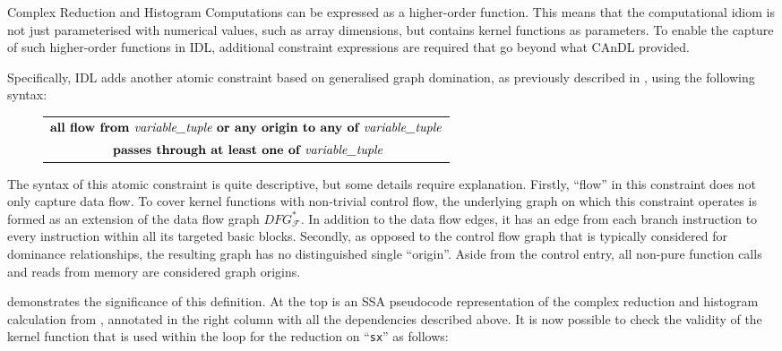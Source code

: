     Complex Reduction and Histogram Computations can be expressed as a
    higher-order function.
    This means that the computational idiom is not just parameterised with
    numerical values, such as array dimensions, but contains kernel functions
    as parameters.
    To enable the capture of such higher-order functions in IDL, additional
    constraint expressions are required that go beyond what CAnDL
    provided.

    Specifically, IDL adds another atomic constraint based on generalised graph
    domination, as previously described in , using the
    following syntax:
\begin{figure}[h]
    \centering
    \begin{tabular}{|c|}
        \hline
        $\textbf{all flow from }\text{\it variable\_tuple}\textbf{ or any origin to any of }\text{\it variable\_tuple}$\\
        $\textbf{ passes through at least one of }\text{\it variable\_tuple}$\\
        \hline
    \end{tabular}
\end{figure}

    \noindent
    The syntax of this atomic constraint is quite descriptive, but some
    details require explanation.
    Firstly, ``flow'' in this constraint does not only capture data flow.
    To cover kernel functions with non-trivial control flow, the
    underlying graph on which this constraint operates is formed as an extension
    of the data flow graph $DFG_\mathcal F^*$.
    In addition to the data flow edges, it has an edge from each branch
    instruction to every instruction within all its targeted basic blocks.
    Secondly, as opposed to the control flow graph that is typically considered
    for dominance relationships, the resulting graph has no distinguished single
    ``origin''.
    Aside from the control entry, all non-pure function calls and reads from
    memory are considered graph origins.

     demonstrates the significance of this definition.
    At the top is an SSA pseudocode representation of the complex reduction and
    histogram calculation from , annotated in the
    right column with all the dependencies described above.
    It is now possible to check the validity of the kernel function that is used
    within the loop for the reduction on ``{\tt sx}'' as follows:
    
